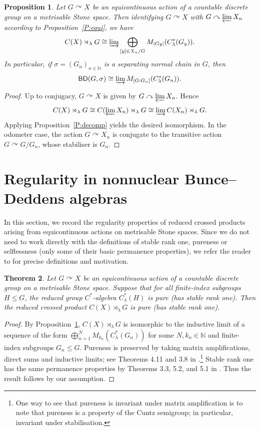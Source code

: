 \documentclass[11pt,a4,leqno]{amsart}
\newtheorem{thm}{Theorem}[section]
\newtheorem{prop}[thm]{Proposition}
\theoremstyle{definition}
\theoremstyle{remark}
\numberwithin{equation}{section}
\theoremstyle{plain}
\newcommand{\Nb}{\mathbb{N}}
\newcommand{\BD}{{\sf{BD}}}
\begin{document}
\begin{prop}\label{P:limit}
    Let $G\curvearrowright X$ be an equicontinuous action of a countable discrete group on a metrisable Stone space. Then identifying $G\curvearrowright X$ with $G\curvearrowright \varprojlim X_n$ according to Proposition~\ref{P:equi}, we have  
    \[
        C(X)\rtimes_\lambda G \cong \varinjlim \bigoplus_{[y]\in X_n/G} M_{|Gy|}(C^*_\lambda(G_y)).
    \]
    In particular, if $\sigma = (G_n)_{n\in\Nb}$ is a separating normal chain in $G$, then 
    \[
        \BD (G,\sigma) \cong \varinjlim M_{[G:G_n]}(C^*_\lambda(G_n)).
    \]    
\end{prop}

\begin{proof}
    Up to conjugacy, $G\curvearrowright X$ is given by $G\curvearrowright \varprojlim X_n$. Hence
    \[
        C(X)\rtimes_\lambda G \cong C(\varprojlim X_n)\rtimes_\lambda G \cong \varinjlim C(X_n)\rtimes_\lambda G. 
    \]
    Applying Proposition~\ref{P:decomp} yields the desired isomorphism. In the odometer case, the action $G\curvearrowright X_n$ is conjugate to the transitive action $G\curvearrowright G/G_n$, whose stabiliser is $G_n$.
\end{proof}

\section{Regularity in nonnuclear Bunce--Deddens algebras}\label{S:regularity}

In this section, we record the regularity properties of reduced crossed products arising from equicontinuous actions on metrisable Stone spaces. Since we do not need to work directly with the definitions of stable rank one, pureness or selflessness (only some of their basic permanence properties), we refer the reader to \cite{Rie83,AntPerThiVil24,Rob25} for precise definitions and motivation. 

\begin{thm}\label{T:sr1pure}
    Let $G\curvearrowright X$ be an equicontinuous action of a countable discrete group on a metrisable Stone space. Suppose that for all finite-index subgroups $H\le G$, the reduced group $C^*$-algebra $C^*_\lambda(H)$ is pure (has stable rank one). Then the reduced crossed product $C(X)\rtimes_\lambda G$ is pure (has stable rank one). 
\end{thm}

\begin{proof}
    By Proposition~\ref{P:limit}, $C(X)\rtimes_\lambda G$ is isomorphic to the inductive limit of a sequence of the form $\bigoplus_{n=1}^N M_{k_n}(C^*_\lambda(G_n))$ for some $N, k_n \in \Nb$ and finite-index subgroups $G_n\le G$. Pureness is preserved by taking matrix amplifications, direct sums and inductive limits; see Theorems 4.11 and 3.8 in \cite{PerThiVil25}.\footnote{One way to see that pureness is invariant under matrix amplification is to note that pureness is a property of the Cuntz semigroup; in particular, invariant under stabilisation.} Stable rank one has the same permanence properties by Theorems 3.3, 5.2, and 5.1 in \cite{Rie83}. Thus the result follows by our assumption. 
\end{proof}
\end{document}
